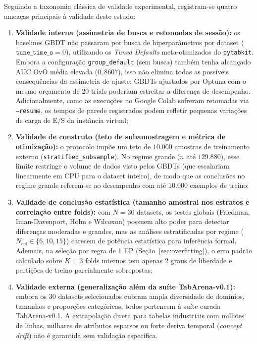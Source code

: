 \documentclass[11pt,a4paper]{article}
\begin{document}
Seguindo a taxonomia clássica de validade experimental, registram-se quatro ameaças principais à validade deste estudo:
\begin{enumerate}[leftmargin=2em]
    \item \textbf{Validade interna (assimetria de busca e retomadas de sessão):} os baselines GBDT não passaram por busca de hiperparâmetros por dataset ($\texttt{tune\_time\_s} = 0$), utilizando os \emph{Tuned Defaults} meta-otimizados do \texttt{pytabkit}. Embora a configuração \texttt{group\_default} (sem busca) também tenha alcançado AUC OvO média elevada ($0{,}8607$), isso não elimina todas as possíveis consequências da assimetria de ajuste: GBDTs ajustados por Optuna com o mesmo orçamento de 20 trials poderiam estreitar a diferença de desempenho. Adicionalmente, como as execuções no Google Colab sofreram retomadas via \texttt{--resume}, os tempos de parede registrados podem refletir pequenas variações de carga de E/S da instância virtual;
    \item \textbf{Validade de construto (teto de subamostragem e métrica de otimização):} o protocolo impõe um teto de $10.000$ amostras de treinamento externo (\texttt{stratified\_subsample}). No regime grande ($n$ até $129.880$), esse limite restringe o volume de dados visto pelos GBDTs (que escalariam linearmente em CPU para o dataset inteiro), de modo que as conclusões no regime grande referem-se ao desempenho com até $10.000$ exemplos de treino;
    \item \textbf{Validade de conclusão estatística (tamanho amostral nos estratos e correlação entre folds):} com $N = 30$ datasets, os testes globais (Friedman, Iman-Davenport, Holm e Wilcoxon) possuem alto poder para detectar diferenças moderadas e grandes, mas as análises estratificadas por regime ($N_{\text{cel}} \in \{6, 10, 15\}$) carecem de potência estatística para inferência formal. Ademais, na seleção por regra de 1 EP (Seção~\ref{sec:overfitting}), o erro padrão calculado sobre $K = 3$ folds internos tem apenas 2 graus de liberdade e partições de treino parcialmente sobrepostas;
    \item \textbf{Validade externa (generalização além da suíte TabArena-v0.1):} embora os 30 datasets selecionados cubram ampla diversidade de domínios, tamanhos e proporções categóricas, todos pertencem à suíte curada TabArena-v0.1. A extrapolação direta para tabelas industriais com milhões de linhas, milhares de atributos esparsos ou forte deriva temporal (\emph{concept drift}) não é garantida sem validação específica.
\end{enumerate}
\end{document}
